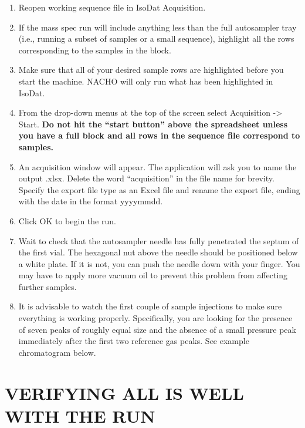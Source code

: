 \documentclass[]{article}
\providecommand{\tightlist}{%
  \setlength{\itemsep}{0pt}\setlength{\parskip}{0pt}}
\begin{document}
\begin{enumerate}
\def\labelenumi{\arabic{enumi}.}
\tightlist
\item
  Reopen working sequence file in IsoDat Acquisition.\\
\item
  If the mass spec run will include anything less than the full
  autosampler tray (i.e., running a subset of samples or a small
  sequence), highlight all the rows corresponding to the samples in the
  block.\\
\item
  Make sure that all of your desired sample rows are highlighted before
  you start the machine. NACHO will only run what has been highlighted
  in IsoDat.\\
\item
  From the drop-down menus at the top of the screen select Acquisition
  -\textgreater{} Start. \textbf{Do not hit the ``start button'' above
  the spreadsheet unless you have a full block and all rows in the
  sequence file correspond to samples.}\\
\item
  An acquisition window will appear. The application will ask you to
  name the output .xlsx. Delete the word ``acquisition'' in the file
  name for brevity. Specify the export file type as an Excel file and
  rename the export file, ending with the date in the format yyyymmdd.
\item
  Click OK to begin the run.
\item
  Wait to check that the autosampler needle has fully penetrated the
  septum of the first vial. The hexagonal nut above the needle should be
  positioned below a white plate. If it is not, you can push the needle
  down with your finger. You may have to apply more vacuum oil to
  prevent this problem from affecting further samples.
\item
  It is advisable to watch the first couple of sample injections to make
  sure everything is working properly. Specifically, you are looking for
  the presence of seven peaks of roughly equal size and the absence of a
  small pressure peak immediately after the first two reference gas
  peaks. See example chromatogram below.
\end{enumerate}

\section{VERIFYING ALL IS WELL WITH THE
RUN}\label{verifying-all-is-well-with-the-run}
\end{document}

